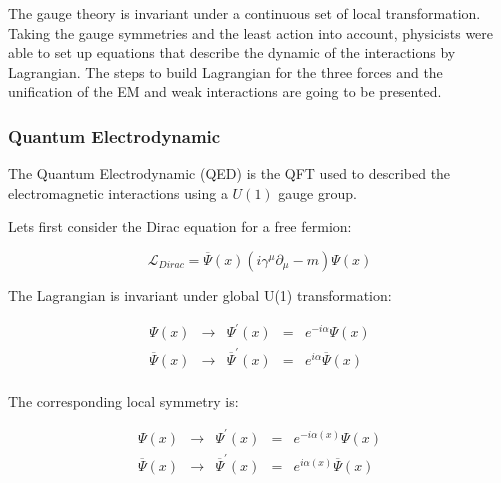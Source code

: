     The gauge theory is invariant under a continuous set of local transformation.
    Taking the gauge symmetries and the least action into account, physicists were able to set up equations that describe the dynamic of the interactions by Lagrangian.
    The steps to build Lagrangian for the three forces and the unification of the EM and weak interactions are going to be presented. 
    
      \subsubsection{Quantum Electrodynamic}

      The Quantum Electrodynamic (QED) is the QFT used to described the electromagnetic interactions using a $U(1)$ gauge group.
     
      Lets first consider the Dirac equation for a free fermion:
      
      \begin{equation}
        \mathcal{L}_{Dirac} = \overline{\Psi}\left(x\right) \left(i \gamma^{\mu}\partial_{\mu} - m \right) \Psi\left(x\right)
      \end{equation}

      The Lagrangian is invariant under global U(1) transformation:

      \begin{equation}
            \begin{array}{rrccr}
             \Psi \left(x \right) & \rightarrow & \Psi^{'} \left(x \right)  & = & e^{-i\alpha} \Psi\left(x\right) \\
             \overline{\Psi}\left(x\right) & \rightarrow & \overline{\Psi}^{'}\left(x\right) & = & e^{i\alpha}  \overline{\Psi}\left(x\right) \\
            \end{array}
      \end{equation}

      The corresponding local symmetry is:

      \begin{equation}
            \begin{array}{rcccr}
             \Psi\left(x\right) & \rightarrow & \Psi^{'} \left(x \right) & = & e^{-i\alpha(x)} \Psi\left(x\right) \\
             \overline{\Psi}\left(x\right) & \rightarrow & \overline{\Psi}^{'}\left(x\right) & = & e^{i\alpha(x)}  \overline{\Psi}\left(x\right) \\
            \end{array}
      \end{equation}

